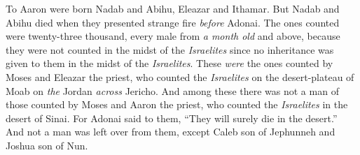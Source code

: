 \begin{biblechapter}
\verse To Aaron were born Nadab and Abihu, Eleazar and Ithamar.
\verse But Nadab and Abihu died when they presented strange fire \textit{before} Adonai.
\verse The ones counted were twenty-three thousand, every male from \textit{a month old} and above, because they were not counted in the midst of the \textit{Israelites} since no inheritance was given to them in the midst of the \textit{Israelites}.
\verse These \textit{were} the ones counted by Moses and Eleazar the priest, who counted the \textit{Israelites} on the desert-plateau of Moab on \textit{the} Jordan \textit{across} Jericho.
\verse And among these there was not a man of those counted by Moses and Aaron the priest, who counted the \textit{Israelites} in the desert of Sinai.
\verse For Adonai said to them, “They will surely die in the desert.” And not a man was left over from them, except Caleb son of Jephunneh and Joshua son of Nun.
\end{biblechapter}

